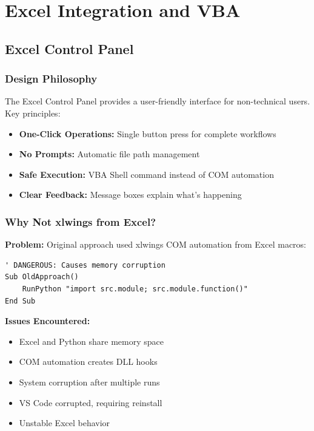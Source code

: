 \chapter{Excel Integration and VBA}

\section{Excel Control Panel}

\subsection{Design Philosophy}

The Excel Control Panel provides a user-friendly interface for non-technical users. Key principles:

\begin{itemize}
    \item \textbf{One-Click Operations:} Single button press for complete workflows
    \item \textbf{No Prompts:} Automatic file path management
    \item \textbf{Safe Execution:} VBA Shell command instead of COM automation
    \item \textbf{Clear Feedback:} Message boxes explain what's happening
\end{itemize}

\subsection{Why Not xlwings from Excel?}

\textbf{Problem:} Original approach used xlwings COM automation from Excel macros:

\begin{lstlisting}[style=vbastyle]
' DANGEROUS: Causes memory corruption
Sub OldApproach()
    RunPython "import src.module; src.module.function()"
End Sub
\end{lstlisting}

\textbf{Issues Encountered:}
\begin{itemize}
    \item Excel and Python share memory space
    \item COM automation creates DLL hooks
    \item System corruption after multiple runs
    \item VS Code corrupted, requiring reinstall
    \item Unstable Excel behavior
\end{itemize}

